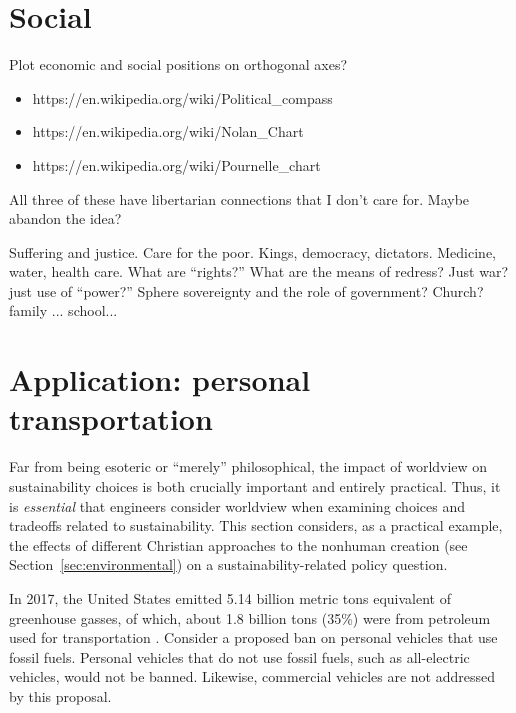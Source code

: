 \documentclass[12pt]{article}
\begin{document}
\section{Social}
\label{sec:social}

Plot economic and social positions on orthogonal axes?
\begin{itemize}
\item{https://en.wikipedia.org/wiki/Political\_compass}
\item{https://en.wikipedia.org/wiki/Nolan\_Chart}
\item{https://en.wikipedia.org/wiki/Pournelle\_chart}
\end{itemize}
All three of these have libertarian connections that I don't care for. Maybe abandon the idea?

Suffering and justice. Care for the poor. 
Kings, democracy, dictators.
Medicine, water, health care. What are ``rights?''
What are the means of redress?
Just war? just use of ``power?''
Sphere sovereignty and the role of government? Church? family ... school...


\section{Application: personal transportation}
\label{sec:personal_transportation}

Far from being esoteric or ``merely'' philosophical, 
the impact of worldview on sustainability choices is both crucially important and entirely practical. 
Thus, it is \emph{essential} that engineers consider worldview
when examining choices and tradeoffs related to sustainability.
This section considers, as a practical example, the effects of different Christian approaches
to the nonhuman creation (see Section~\ref{sec:environmental}) 
on a sustainability-related policy question.

In 2017, the United States emitted 5.14 billion metric tons equivalent of greenhouse gasses, of which, 
about 1.8 billion tons (35\%) were from petroleum used for transportation \cite{EIA2017}.
Consider a proposed ban on personal vehicles that use fossil fuels.
Personal vehicles that do not use fossil fuels, such as all-electric vehicles, would not be banned. 
Likewise, commercial vehicles are not addressed by this proposal. %
\end{document}
